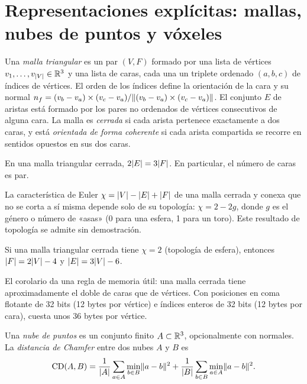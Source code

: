 \section{Representaciones explícitas: mallas, nubes de puntos y vóxeles}

\begin{definicion}\label{def:malla}
Una \emph{malla triangular} es un par $(V,F)$ formado por una lista de vértices $v_1,\dots,v_{\lvert V\rvert}\in\mathbb{R}^3$ y una lista de caras, cada una un triplete ordenado $(a,b,c)$ de índices de vértices. El orden de los índices define la orientación de la cara y su normal $n_f=(v_b-v_a)\times(v_c-v_a)/\lVert(v_b-v_a)\times(v_c-v_a)\rVert$. El conjunto $E$ de aristas está formado por los pares no ordenados de vértices consecutivos de alguna cara. La malla es \emph{cerrada} si cada arista pertenece exactamente a dos caras, y está \emph{orientada de forma coherente} si cada arista compartida se recorre en sentidos opuestos en sus dos caras.
\end{definicion}

\begin{proposicion}\label{prop:3f2e}
En una malla triangular cerrada, $2\lvert E\rvert=3\lvert F\rvert$. En particular, el número de caras es par.
\end{proposicion}

La característica de Euler $\chi=\lvert V\rvert-\lvert E\rvert+\lvert F\rvert$ de una malla cerrada y conexa que no se corta a sí misma depende solo de su topología: $\chi=2-2g$, donde $g$ es el género o número de «asas» (0 para una esfera, 1 para un toro). Este resultado de topología se admite sin demostración.

\begin{corolario}\label{cor:euler}
Si una malla triangular cerrada tiene $\chi=2$ (topología de esfera), entonces $\lvert F\rvert=2\lvert V\rvert-4$ y $\lvert E\rvert=3\lvert V\rvert-6$.
\end{corolario}

El corolario da una regla de memoria útil: una malla cerrada tiene aproximadamente el doble de caras que de vértices. Con posiciones en coma flotante de 32 bits (12 bytes por vértice) e índices enteros de 32 bits (12 bytes por cara), cuesta unos 36 bytes por vértice.

\begin{definicion}\label{def:chamfer}
Una \emph{nube de puntos} es un conjunto finito $A\subset\mathbb{R}^3$, opcionalmente con normales. La \emph{distancia de Chamfer} entre dos nubes $A$ y $B$ es
\[
\operatorname{CD}(A,B)=\frac{1}{\lvert A\rvert}\sum_{a\in A}\min_{b\in B}\lVert a-b\rVert^2+\frac{1}{\lvert B\rvert}\sum_{b\in B}\min_{a\in A}\lVert a-b\rVert^2 .
\]
\end{definicion}

